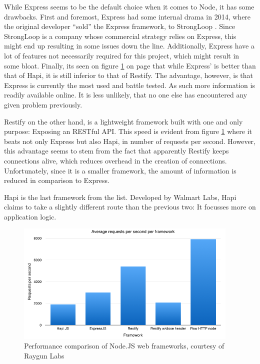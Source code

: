 				While Express seems to be the default choice when it comes to Node, it has some	drawbacks. First and foremost, Express had some internal drama in 2014, where the original developer ``sold'' the Express framework, to StrongLoop . Since StrongLoop is a company whose commercial strategy relies on Express, this might end up resulting in some issues down the line. Additionally, Express have a lot of features not necessarily required for this project, which might result in some bloat. Finally, its seen on figure \ref{fig:node_performance} on page \pageref{fig:node_performance} that while Express' is better than that of Hapi, it is still inferior to that of Restify. The advantage, however, is that Express is currently the most used and battle tested. As such more information is readily available online. It is less unlikely, that no one else has encountered any given problem previously.

				Restify on the other hand, is a lightweight framework built with one and only purpose: Exposing an RESTful API. This speed is evident from figure \ref{fig:node_performance} where it beats not only Express but also Hapi, in number of requests per second. However, this advantage seems to stem from the fact that apparently Restify keeps connections alive, which reduces overhead in the creation of connections. Unfortunately, since it is a smaller framework, the amount of information is reduced in comparison to Express.

				
				Hapi is the last framework from the list. Developed by Walmart Labs, Hapi claims to take a slightly different route than the previous two: It focusses more on application logic. 

				\begin{figure}[htbp]
					\centering
					\includegraphics[width=0.95\textwidth]{figures/design/node-framework-performance.png}
					\caption{Performance comparison of Node.JS web frameworks, courtesy of Raygun Labs \cite{node_framework}}
					\label{fig:node_performance}
				\end{figure}

